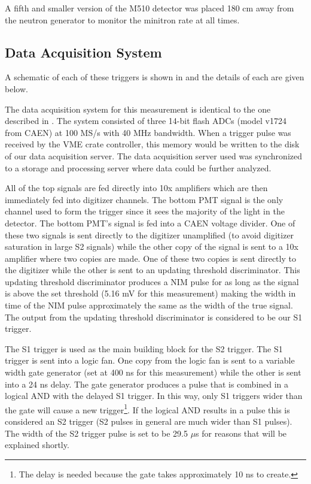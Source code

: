 A fifth and smaller version of the M510 detector was placed 180 cm away from the neutron generator to monitor the minitron rate at all times.



\subsection{Data Acquisition System}
\label{sec:nerix_daq_trigger}

A schematic of each of these triggers is shown in  and the details of each are given below.

The data acquisition system for this measurement is identical to the one described in .  The system consisted of three 14-bit flash ADCs (model v1724 from CAEN) at 100 MS/s with 40 MHz bandwidth.  When a trigger pulse was received by the VME crate controller, this memory would be written to the disk of our data acquisition server.  The data acquisition server used was synchronized to a storage and processing server where data could be further analyzed.

All of the top signals are fed directly into 10x amplifiers which are then immediately fed into digitizer channels.  The bottom PMT signal is the only channel used to form the trigger since it sees the majority of the light in the detector.  The bottom PMT's signal is fed into a CAEN voltage divider.  One of these two signals is sent directly to the digitizer unamplified (to avoid digitizer saturation in large S2 signals) while the other copy of the signal is sent to a 10x amplifier where two copies are made.  One of these two copies is sent directly to the digitizer while the other is sent to an updating threshold discriminator.  This updating threshold discriminator produces a NIM pulse for as long as the signal is above the set threshold (5.16 mV for this measurement) making the width in time of the NIM pulse approximately the same as the width of the true signal.  The output from the updating threshold discriminator is considered to be our S1 trigger.  

The S1 trigger is used as the main building block for the S2 trigger.  The S1 trigger is sent into a logic fan.  One copy from the logic fan is sent to a variable width gate generator (set at 400 ns for this measurement) while the other is sent into a 24 ns delay.  The gate generator produces a \nimbar{} pulse that is combined in a logical AND with the delayed S1 trigger.  In this way, only S1 triggers wider than the gate will cause a new trigger\footnote{The delay is needed because the gate takes approximately 10 ns to create.}.  If the logical AND results in a pulse this is considered an S2 trigger (S2 pulses in general are much wider than S1 pulses).  The width of the S2 trigger pulse is set to be 29.5 $\mu$s for reasons that will be explained shortly.

